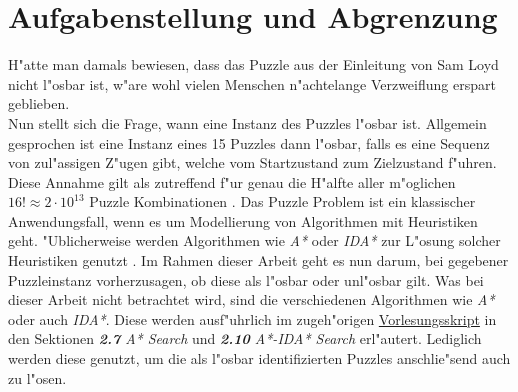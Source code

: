 \section{Aufgabenstellung und Abgrenzung} %
\label{cha:Aufgabenstellung}
H"atte man damals bewiesen, dass das Puzzle aus der Einleitung von Sam Loyd nicht l"osbar ist, w"are wohl vielen Menschen n"achtelange Verzweiflung erspart geblieben.\\
Nun stellt sich die Frage, wann eine Instanz des Puzzles l"osbar ist. Allgemein gesprochen ist eine Instanz eines 15 Puzzles dann l"osbar, falls es eine Sequenz von zul"assigen Z"ugen gibt, welche vom Startzustand zum Zielzustand f"uhren.\\
Diese Annahme gilt als zutreffend f"ur genau die H"alfte aller m"oglichen $16! \approx 2 \cdot 10^{13}$ Puzzle Kombinationen \autocite{sliding-piece-puzzels:book,solving-15-puzzle-lvi:article}.
Das Puzzle Problem ist ein klassischer Anwendungsfall, wenn es um Modellierung von Algorithmen mit Heuristiken geht. "Ublicherweise werden Algorithmen wie \textit{A*} oder \textit{IDA*} zur L"osung solcher Heuristiken genutzt \autocite{wiki-15-puzzle:online,solving-15-puzzle-lvi:article, depth-first-id:article}.
Im Rahmen dieser Arbeit geht es nun darum, bei gegebener Puzzleinstanz vorherzusagen, ob diese als l"osbar oder unl"osbar gilt.
Was bei dieser Arbeit nicht betrachtet wird, sind die verschiedenen Algorithmen wie \textit{A*} oder auch \textit{IDA*}. Diese werden ausf"uhrlich im zugeh"origen \textcolor{violet}{\href{https://github.com/karlstroetmann/Artificial-Intelligence/blob/master/Lecture-Notes/artificial-intelligence.pdf}{Vorlesungsskript}} \autocite{github-stroetmann:online} in den Sektionen \textit{\textbf{2.7} A* Search} und \textit{\textbf{2.10} A*-IDA* Search} erl"autert.
Lediglich werden diese genutzt, um die als l"osbar identifizierten Puzzles anschlie"send auch zu l"osen.



